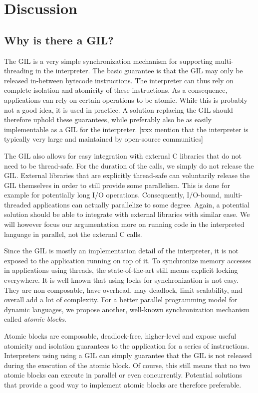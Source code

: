 \documentclass{sigplanconf}
\begin{document}
\section{Discussion}
\subsection{Why is there a GIL?}
The GIL is a very simple synchronization mechanism for supporting
multi-threading in the interpreter. The basic guarantee is that the
GIL may only be released in-between bytecode instructions. The
interpreter can thus rely on complete isolation and atomicity of these
instructions. As a consequence, applications can rely on certain
operations to be atomic. While this is probably not a good idea,
it is used in practice. A solution replacing the GIL should therefore
uphold these guarantees, while preferably also be as easily
implementable as a GIL for the interpreter.
[xxx mention that the interpreter is typically very large and maintained
by open-source communities]

The GIL also allows for easy integration with external C libraries that
do not need to be thread-safe. For the duration of the calls, we
simply do not release the GIL. External libraries that are explicitly
thread-safe can voluntarily release the GIL themselves in order to
still provide some parallelism. This is done for example for
potentially long I/O operations. Consequently, I/O-bound,
multi-threaded applications can actually parallelize to some
degree. Again, a potential solution should be able to integrate with
external libraries with similar ease. We will however focus our
argumentation more on running code in the interpreted language in
parallel, not the external C calls.

Since the GIL is mostly an implementation detail of the interpreter,
it is not exposed to the application running on top of it. To
synchronize memory accesses in applications using threads, the
state-of-the-art still means explicit locking everywhere. It is well
known that using locks for synchronization is not easy.  They are
non-composable, have overhead, may deadlock, limit scalability, and
overall add a lot of complexity. For a better parallel programming
model for dynamic languages, we propose another, well-known
synchronization mechanism called \emph{atomic blocks}.

Atomic blocks are composable, deadlock-free, higher-level and expose
useful atomicity and isolation guarantees to the application for a
series of instructions.  Interpreters using using a GIL can simply
guarantee that the GIL is not released during the execution of the
atomic block. Of course, this still means that no two atomic blocks
can execute in parallel or even concurrently. Potential solutions
that provide a good way to implement atomic blocks are therefore
preferable.
\end{document}
